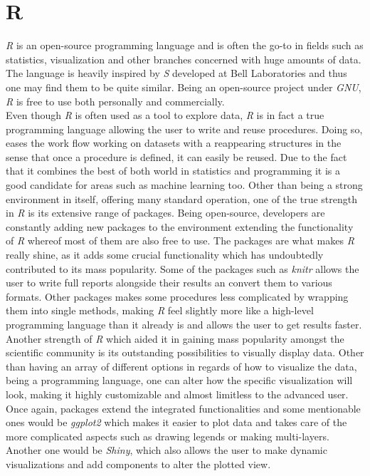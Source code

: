 \documentclass[11pt]{article}
\begin{document}
 


\section*{R}

\textit{R} is an open-source programming language and is often the go-to in fields such as statistics, visualization and other branches concerned with huge amounts of data. The language is heavily inspired by \textit{S} developed at Bell Laboratories and thus one may find them to be quite similar. Being an open-source project under \textit{GNU}, \textit{R} is free to use both personally and commercially.\\

 Even though \textit{R} is often used as a tool to explore data, \textit{R} is in fact a true programming language allowing the user to write and reuse procedures. Doing so, eases the work flow working on datasets with a reappearing structures in the sense that once a procedure is defined, it can easily be reused. Due to the fact that it combines the best of both world in statistics and programming  it is a good candidate for areas such as machine learning too. Other than being a strong environment in itself, offering many standard operation, one of the true strength in \textit{R} is its extensive range of packages. Being open-source, developers are constantly adding new packages to the environment extending the functionality of \textit{R} whereof most of them are also free to use. The packages are what makes \textit{R} really shine, as it adds some crucial functionality which has undoubtedly contributed to its mass popularity. Some of the packages such as \textit{knitr} allows the user to write full reports alongside their results an convert them to various formats. Other packages makes some procedures less complicated by wrapping them into single methods, making \textit{R} feel slightly more like a high-level programming language than it already is and allows the user to get results faster. Another strength of \textit{R} which aided it in gaining mass popularity amongst the scientific community is its outstanding possibilities to visually display data. Other than having an array of different options in regards of how to visualize the data, being a programming language, one can alter how the specific visualization will look, making it highly customizable and almost limitless to the advanced user. Once again, packages extend the integrated functionalities and some mentionable ones would be \textit{ggplot2} which makes it easier to plot data and takes care of the more complicated aspects such as drawing legends or making multi-layers. Another one would be \textit{Shiny}, which also allows the user to make dynamic visualizations and add components to alter the plotted view. \\
 
\end{document}

